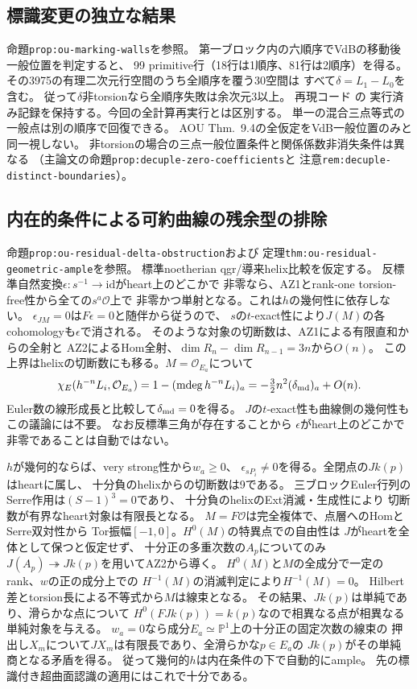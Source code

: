 \documentclass[11pt,a4paper]{ltjsarticle}
\begin{document}
\subsection*{標識変更の独立な結果}
命題\texttt{prop:ou-marking-walls}を参照。
第一ブロック内の六順序でVdBの移動後一般位置を判定すると、
99 primitive行（18行は1順序、81行は2順序）を得る。
その3975の有理二次元行空間のうち全順序を覆う30空間は
すべて$\delta=L_1-L_0$を含む。
従って$\delta$非torsionなら全順序失敗は余次元3以上。
再現コード  の
実行済み記録を保持する。今回の全計算再実行とは区別する。
単一の混合三点等式の一般点は別の順序で回復できる。
AOU Thm.~9.4の全仮定をVdB一般位置のみと同一視しない。
非torsionの場合の三点一般位置条件と関係係数非消失条件は異なる
（主論文の命題\texttt{prop:decuple-zero-coefficients}と
注意\texttt{rem:decuple-distinct-boundaries}）。

\subsection*{内在的条件による可約曲線の残余型の排除}
命題\texttt{prop:ou-residual-delta-obstruction}および
定理\texttt{thm:ou-residual-geometric-ample}を参照。
標準noetherian qgr/導来helix比較を仮定する。
反標準自然変換$\epsilon:s^{-1}\to\mathrm{id}$がheart上のどこかで
非零なら、AZ1とrank-one torsion-free性から全ての$s^a\mathcal O$上で
非零かつ単射となる。これは$h$の幾何性に依存しない。
$\epsilon_{JM}=0$は$F\epsilon=0$と随伴から従うので、
$s$の$t$-exact性により$J(M)$の各cohomologyも$\epsilon$で消される。
そのような対象の切断数は、AZ1による有限直和からの全射と
AZ2によるHom全射、$\dim R_n-\dim R_{n-1}=3n$から$O(n)$。
この上界はhelixの切断数にも移る。$M=\mathcal O_{E_a}$について
\[
 \chi_E(h^{-n}L_i,\mathcal O_{E_a})
 =1-(\operatorname{mdeg}h^{-n}L_i)_a
 =-\tfrac32n^2(\delta_{\rm md})_a+O(n).
\]
Euler数の線形成長と比較して$\delta_{\rm md}=0$を得る。
$J$の$t$-exact性も曲線側の幾何性もこの議論には不要。
なお反標準三角が存在することから
$\epsilon$がheart上のどこかで非零であることは自動ではない。

$h$が幾何的ならば、very strong性から$w_a\geq0$、
$\epsilon_{sP_i}\ne0$を得る。全閉点の$Jk(p)$はheartに属し、
十分負のhelixからの切断数は9である。
三ブロックEuler行列のSerre作用は$(S-1)^3=0$であり、
十分負のhelixのExt消滅・生成性により
切断数が有界なheart対象は有限長となる。
$M=F\mathcal O$は完全複体で、点層へのHomとSerre双対性から
Tor振幅$[-1,0]$。$H^0(M)$の特異点での自由性は
$J$がheartを全体として保つと仮定せず、
十分正の多重次数の$A_p$についてのみ
$J(A_p)\twoheadrightarrow Jk(p)$を用いてAZ2から導く。
$H^0(M)$と$M$の全成分で一定のrank、$w$の正の成分上での
$H^{-1}(M)$の消滅判定により$H^{-1}(M)=0$。
Hilbert差とtorsion長による不等式から$M$は線束となる。
その結果、$Jk(p)$は単純であり、滑らかな点について
$H^0(FJk(p))=k(p)$なので相異なる点が相異なる単純対象を与える。
$w_a=0$なら成分$E_a\simeq\mathbb P^1$上の十分正の固定次数の線束の
押出し$X_m$について$JX_m$は有限長であり、全滑らかな$p\in E_a$の
$Jk(p)$がその単純商となる矛盾を得る。
従って幾何的$h$は内在条件の下で自動的にample。
先の標識付き超曲面認識の適用にはこれで十分である。
\end{document}
